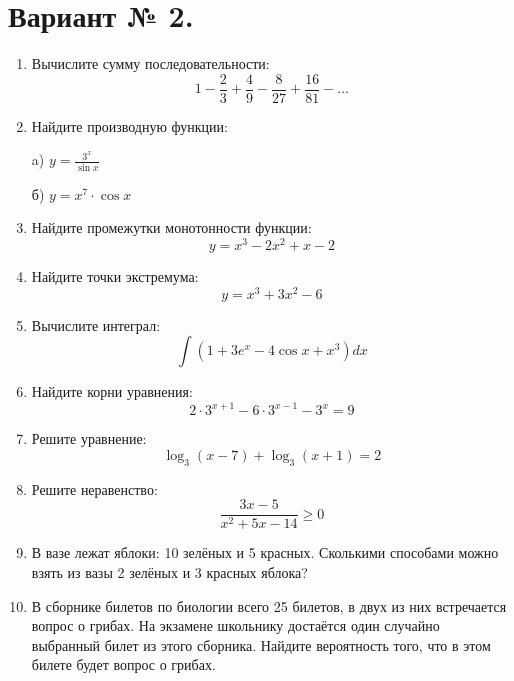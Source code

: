 \documentclass{article}
\begin{document}
\section*{Вариант № 2.}
\begin{enumerate}

\item %
Вычислите сумму последовательности:
$$1-\frac{2}{3}+\frac{4}{9}-\frac{8}{27}+\frac{16}{81}-\ldots$$

\item %
Найдите производную функции:

a) $y=\frac{3^x}{\sin{x}}$

б) $y=x^{7}\cdot\cos{x}$

\item %
Найдите промежутки монотонности функции:
$$y=x^3-2x^2+x-2$$

\item %
Найдите точки экстремума:
$$y=x^3+3x^2-6$$

\item %
Вычислите интеграл:
$$\int{\left(1+3e^x-4\cos{x}+x^3\right)dx}$$

\item %
Найдите корни уравнения:
$$2\cdot3^{x+1}-6\cdot3^{x-1}-3^x=9$$

\item %
Решите уравнение:
$$\log_3{(x-7)}+\log_3{(x+1)}=2$$

\item %
Решите неравенство:
$$\frac{3x-5}{x^2+5x-14}\geq0$$

\item %
В вазе лежат яблоки: 10 зелёных и 5 красных. Сколькими способами можно взять из вазы 2 зелёных и 3 красных яблока?

\item %
В сборнике билетов по биологии всего 25 билетов, в двух из них встречается вопрос о грибах. На экзамене школьнику достаётся один случайно выбранный билет из этого сборника. Найдите вероятность того, что в этом билете будет вопрос о грибах.

\end{enumerate}
\end{document}
